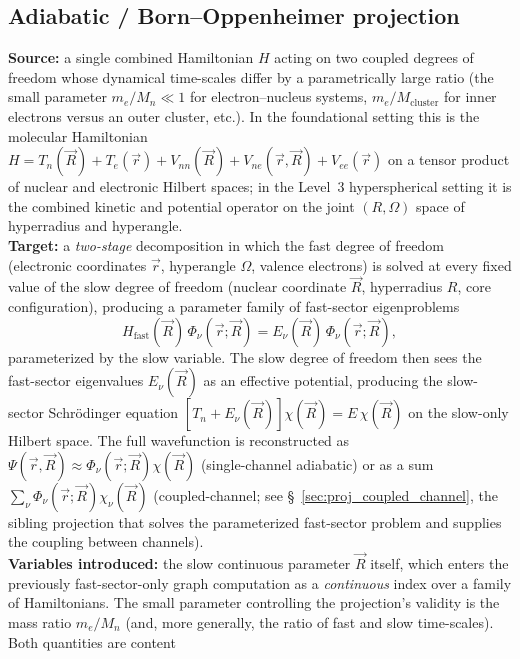 \documentclass[11pt]{article}
\begin{document}
\subsection{Adiabatic / Born--Oppenheimer projection}
\label{sec:proj_adiabatic_BO}
\textbf{Source:} a single combined Hamiltonian $H$ acting on two
coupled degrees of freedom whose dynamical time-scales differ by a
parametrically large ratio (the small parameter $m_e / M_n \ll 1$ for
electron--nucleus systems, $m_e / M_\text{cluster}$ for inner electrons
versus an outer cluster, etc.).  In the foundational setting this is
the molecular Hamiltonian $H = T_n(\vec{R}) + T_e(\vec{r}) +
V_{nn}(\vec{R}) + V_{ne}(\vec{r}, \vec{R}) + V_{ee}(\vec{r})$ on a tensor
product of nuclear and electronic Hilbert spaces; in the Level~3
hyperspherical setting it is the combined kinetic and potential
operator on the joint $(R, \Omega)$ space of hyperradius and
hyperangle.\\
\textbf{Target:} a \emph{two-stage} decomposition in which the fast
degree of freedom (electronic coordinates $\vec{r}$, hyperangle
$\Omega$, valence electrons) is solved at every fixed value of the
slow degree of freedom (nuclear coordinate $\vec{R}$, hyperradius $R$,
core configuration), producing a parameter family of fast-sector
eigenproblems
\begin{equation*}
  H_\text{fast}(\vec{R}) \, \Phi_\nu(\vec{r}; \vec{R})
  = E_\nu(\vec{R}) \, \Phi_\nu(\vec{r}; \vec{R}),
\end{equation*}
parameterized by the slow variable.  The slow degree of freedom then
sees the fast-sector eigenvalues $E_\nu(\vec{R})$ as an effective
potential, producing the slow-sector Schr\"odinger equation
$[T_n + E_\nu(\vec{R})] \chi(\vec{R}) = E\, \chi(\vec{R})$ on the
slow-only Hilbert space.  The full wavefunction is reconstructed as
$\Psi(\vec{r}, \vec{R}) \approx \Phi_\nu(\vec{r}; \vec{R}) \chi(\vec{R})$
(single-channel adiabatic) or as a sum
$\sum_\nu \Phi_\nu(\vec{r}; \vec{R}) \chi_\nu(\vec{R})$
(coupled-channel; see \S~\ref{sec:proj_coupled_channel}, the
sibling projection that solves the parameterized fast-sector problem
and supplies the coupling between channels).
\\
\textbf{Variables introduced:} the slow continuous parameter $\vec{R}$
itself, which enters the previously fast-sector-only graph
computation as a \emph{continuous} index over a family of
Hamiltonians.  The small parameter controlling the projection's
validity is the mass ratio $m_e / M_n$ (and, more generally, the
ratio of fast and slow time-scales).  Both quantities are content
\end{document}
